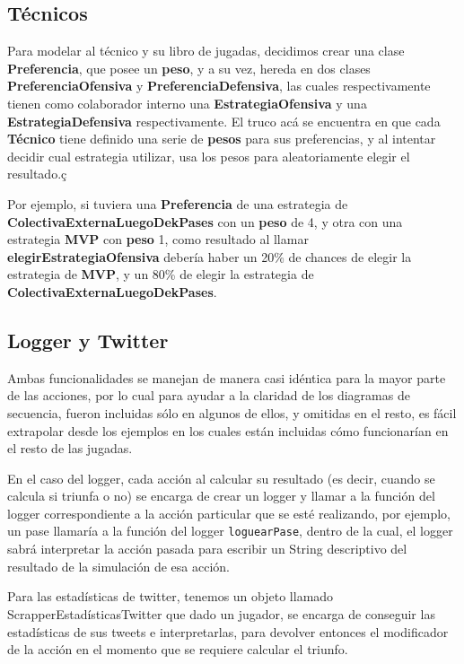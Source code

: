 \subsection{Técnicos}
Para modelar al técnico y su libro de jugadas, decidimos crear una clase \textbf{Preferencia}, que posee un \textbf{peso}, y a su vez, hereda en dos clases \textbf{PreferenciaOfensiva} y \textbf{PreferenciaDefensiva}, las cuales respectivamente tienen como colaborador interno una \textbf{EstrategiaOfensiva} y una \textbf{EstrategiaDefensiva} respectivamente. El truco acá se encuentra en que cada \textbf{Técnico} tiene definido una serie de \textbf{pesos} para sus preferencias, y al intentar decidir cual estrategia utilizar, usa los pesos para aleatoriamente elegir el resultado.ç

Por ejemplo, si tuviera una \textbf{Preferencia} de una estrategia de \textbf{ColectivaExternaLuegoDekPases} con un \textbf{peso} de 4, y  otra con una estrategia \textbf{MVP} con \textbf{peso} 1, como resultado al llamar \textbf{elegirEstrategiaOfensiva} debería haber un 20\% de chances de elegir la estrategia de \textbf{MVP}, y un 80\% de elegir la estrategia de \textbf{ColectivaExternaLuegoDekPases}.

\subsection{Logger y Twitter}
Ambas funcionalidades se manejan de manera casi idéntica para la mayor parte de las acciones, por lo cual para ayudar a la claridad de los diagramas de secuencia, fueron incluidas sólo en algunos de ellos, y omitidas en el resto, es fácil extrapolar desde los ejemplos en los cuales están incluidas cómo funcionarían en el resto de las jugadas.

En el caso del logger, cada acción al calcular su resultado (es decir, cuando se calcula si triunfa o no) se encarga de crear un logger y llamar a la función del logger correspondiente a la acción particular que se esté realizando, por ejemplo, un pase llamaría a la función del logger \texttt{loguearPase}, dentro de la cual, el logger sabrá interpretar la acción pasada para escribir un String descriptivo del resultado de la simulación de esa acción.

Para las estadísticas de twitter, tenemos un objeto llamado ScrapperEstadísticasTwitter que dado un jugador, se encarga de conseguir las estadísticas de sus tweets e interpretarlas, para devolver entonces el modificador de la acción en el momento que se requiere calcular el triunfo.

